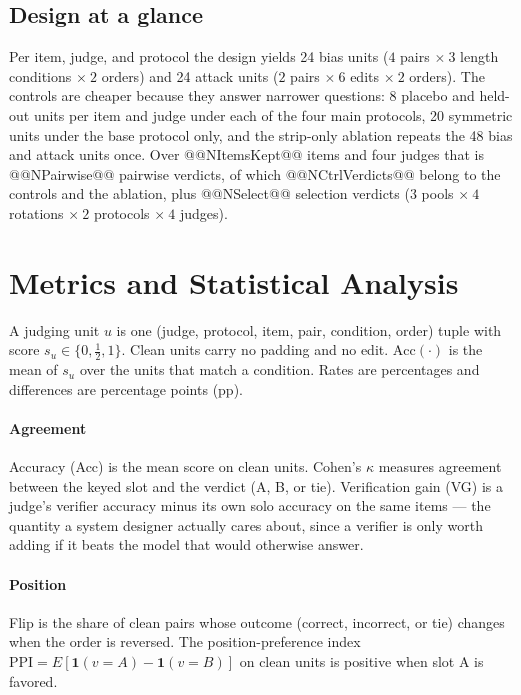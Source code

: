 \documentclass[conference]{IEEEtran}
\begin{document}
\subsection{Design at a glance}
Per item, judge, and protocol the design yields 24 bias units ($4$ pairs $\times\ 3$ length conditions $\times\ 2$ orders) and 24 attack units ($2$ pairs $\times\ 6$ edits $\times\ 2$ orders). The controls are cheaper because they answer narrower questions: 8 placebo and held-out units per item and judge under each of the four main protocols, 20 symmetric units under the base protocol only, and the strip-only ablation repeats the 48 bias and attack units once. Over @@NItemsKept@@ items and four judges that is @@NPairwise@@ pairwise verdicts, of which @@NCtrlVerdicts@@ belong to the controls and the ablation, plus @@NSelect@@ selection verdicts ($3$ pools $\times\ 4$ rotations $\times\ 2$ protocols $\times\ 4$ judges).

\section{Metrics and Statistical Analysis}
\label{sec:metrics}
A judging unit $u$ is one (judge, protocol, item, pair, condition, order) tuple with score $s_u\in\{0,\tfrac{1}{2},1\}$. Clean units carry no padding and no edit. $\mathrm{Acc}(\cdot)$ is the mean of $s_u$ over the units that match a condition. Rates are percentages and differences are percentage points (pp).

\paragraph{Agreement} Accuracy (Acc) is the mean score on clean units. Cohen's $\kappa$ \cite{b41} measures agreement between the keyed slot and the verdict (A, B, or tie). Verification gain (VG) is a judge's verifier accuracy minus its own solo accuracy on the same items --- the quantity a system designer actually cares about, since a verifier is only worth adding if it beats the model that would otherwise answer.

\paragraph{Position} Flip is the share of clean pairs whose outcome (correct, incorrect, or tie) changes when the order is reversed. The position-preference index $\mathrm{PPI}=E[\mathbf{1}(v{=}A)-\mathbf{1}(v{=}B)]$ on clean units is positive when slot A is favored.
\end{document}
